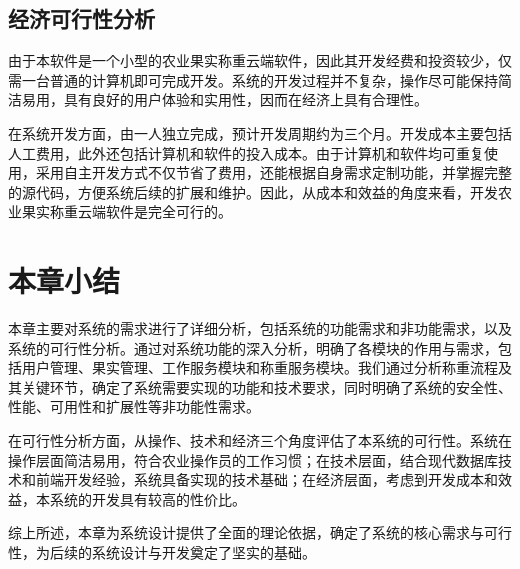 \subsection{经济可行性分析}

由于本软件是一个小型的农业果实称重云端软件，因此其开发经费和投资较少，仅需一台普通的计算机即可完成开发。系统的开发过程并不复杂，操作尽可能保持简洁易用，具有良好的用户体验和实用性，因而在经济上具有合理性。

在系统开发方面，由一人独立完成，预计开发周期约为三个月。开发成本主要包括人工费用，此外还包括计算机和软件的投入成本。由于计算机和软件均可重复使用，采用自主开发方式不仅节省了费用，还能根据自身需求定制功能，并掌握完整的源代码，方便系统后续的扩展和维护。因此，从成本和效益的角度来看，开发农业果实称重云端软件是完全可行的。

\section{本章小结}

本章主要对系统的需求进行了详细分析，包括系统的功能需求和非功能需求，以及系统的可行性分析。通过对系统功能的深入分析，明确了各模块的作用与需求，包括用户管理、果实管理、工作服务模块和称重服务模块。我们通过分析称重流程及其关键环节，确定了系统需要实现的功能和技术要求，同时明确了系统的安全性、性能、可用性和扩展性等非功能性需求。

在可行性分析方面，从操作、技术和经济三个角度评估了本系统的可行性。系统在操作层面简洁易用，符合农业操作员的工作习惯；在技术层面，结合现代数据库技术和前端开发经验，系统具备实现的技术基础；在经济层面，考虑到开发成本和效益，本系统的开发具有较高的性价比。

综上所述，本章为系统设计提供了全面的理论依据，确定了系统的核心需求与可行性，为后续的系统设计与开发奠定了坚实的基础。

